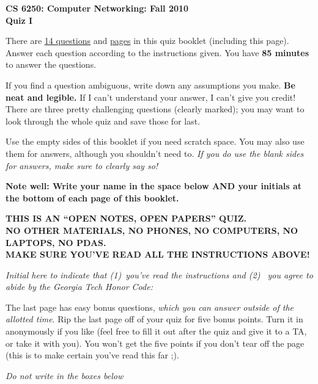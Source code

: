 \documentclass[11pt]{article}
\newcounter{answer}
\begin{document}
\begin{center}
{\Large{\bf CS 6250: Computer Networking: Fall 2010} \\
 \vspace{.15in} \Huge{\bf Quiz I}} 
\vspace{.2in}

\begin{boxedminipage}[h]{6in}
There are \underline{14 questions} and
  \underline{\pageref{lastpage} pages} in this quiz booklet (including
  this page).  Answer each question according to the instructions given.
  You have {\bf 85 minutes} to answer the questions.



\vspace{.1in} 
If you find a question ambiguous, write down any
assumptions you make.  {\bf Be neat and legible.}  If I can't
understand your answer, I can't give you credit!  There are three pretty
challenging questions (clearly marked); you may want to look through the
whole quiz and save those for last.

\vspace{.1in} 
Use the empty sides of this booklet if you need scratch space.  You
may also use them for answers, although you shouldn't need to.  {\em If you
do use the blank sides for answers, make sure to clearly say so!}

\vspace{.1in} 
{\bf Note well: Write your name in the space below AND your initials at the bottom of each
page of this booklet.}

\begin{center}{\bf THIS IS AN ``OPEN NOTES, OPEN PAPERS'' QUIZ.\\
NO OTHER MATERIALS, NO PHONES, NO COMPUTERS, NO LAPTOPS, NO PDAS.\\
MAKE SURE YOU'VE READ ALL THE INSTRUCTIONS ABOVE!}
\end{center}
{\em Initial here to indicate that (1)~you've read the instructions and (2)~
you agree to abide by the Georgia Tech Honor Code: }



\vspace{.05in} The last page has easy bonus questions, {\em which you can
answer outside of the allotted time}.  Rip the last page off of your
quiz for five bonus points.  Turn it in anonymously if you like (feel
free to fill it out after the quiz and give it to a TA, or take it with you).  You
won't get the five points if you don't tear off the page (this is to
make certain you've read this far ;).

\end{boxedminipage}
\end{center}
\vspace*{0.15in}
\begin{center}
{\it Do not write in the boxes below}
\end{center}
\end{document}
